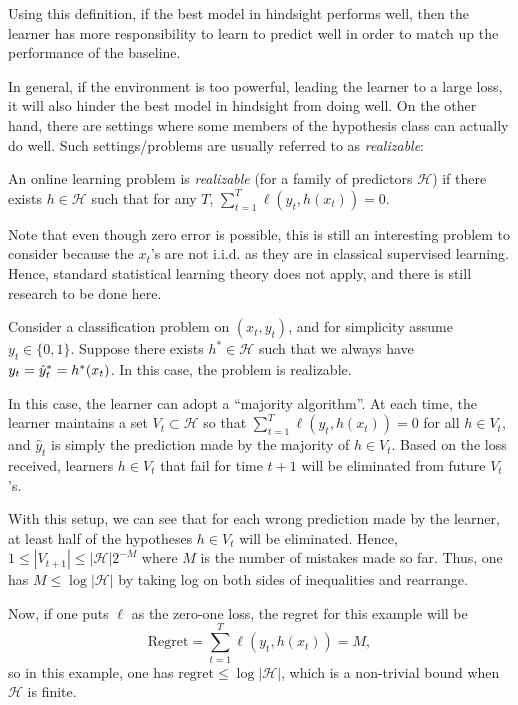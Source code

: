 Using this definition, if the best model in hindsight performs well, then the learner has more responsibility to learn to predict well in order to match up the performance of the baseline.
    
In general, if the environment is too powerful, leading the learner to a large loss, it will also hinder the best model in hindsight from doing well. On the other hand, there are settings where some members of the hypothesis class can actually do well. Such settings/problems are usually referred to as \textit{realizable}:

\begin{definition}
An online learning problem is \textit{realizable} (for a family of predictors $\mathcal{H}$) if there exists $h \in \mathcal{H}$ such that for any $T$, $\sum_{t = 1}^T \ell(y_t, h(x_t)) = 0$.
\end{definition}

Note that even though zero error is possible, this is still an interesting problem to consider because the $x_t$'s are not i.i.d. as they are in classical supervised learning. Hence, standard statistical learning theory does not apply, and there is still research to be done here.

\begin{example}
Consider a classification problem on $(x_t, y_t)$, and for simplicity assume $y_t \in \{0, 1\}$. Suppose there exists $h^* \in \mathcal{H}$ such that we always have $y_t = \hat{y}^*_t = h^*(x_t)$. In this case, the problem is realizable. 
    
In this case, the learner can adopt a ``majority algorithm''. At each time, the learner maintains a set $V_t \subset \mathcal{H}$ so that $\sum_{t=1}^T \ell (y_t, h(x_t)) = 0$ for all $h \in V_t$, and $\hat{y}_t$ is simply the prediction made by the majority of $h \in V_t$. Based on the loss received, learners $h \in V_t$ that fail for time $t + 1$ will be eliminated from future $V_t$'s.
    
With this setup, we can see that for each wrong prediction made by the learner, at least half of the hypotheses $h \in V_t$ will be eliminated. Hence, $1 \leq |V_{t+1}| \leq |\mathcal{H}|2^{-M}$ where $M$ is the number of mistakes made so far. Thus, one has $M \leq \log |\mathcal{H}|$ by taking log on both sides of inequalities and rearrange.
    
Now, if one puts $\ell$ as the zero-one loss, the regret for this example will be
\begin{equation}
\text{Regret} = \sum_{t=1}^T \ell(y_t, h(x_t)) = M,
\end{equation}
so in this example, one has $\text{regret} \leq \log |\mathcal{H}|$, which is a non-trivial bound when $\mathcal{H}$ is finite.
\end{example}
    
